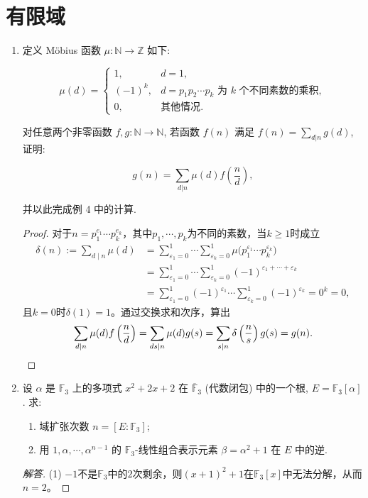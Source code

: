 \section{有限域}

\begin{enumerate}
\item 定义 Möbius 函数 $\mu : \mathbb{N} \to \mathbb{Z}$ 如下:

\[
\mu(d) =
\begin{cases}
1, & d = 1, \\
(-1)^k, & d = p_1p_2 \cdots p_k\text{ 为 }k\text{ 个不同素数的乘积}, \\
0, & \text{其他情况}.
\end{cases}
\]

对任意两个非零函数 $f, g : \mathbb{N} \to \mathbb{N}$, 若函数 $f(n)$ 满足 $f(n) = \sum\limits_{d|n} g(d)$, 证明:

\[
g(n) = \sum_{d|n} \mu(d) f\left(\frac{n}{d}\right),
\]

并以此完成例 4 中的计算.
\begin{proof}
    对于$n=p_1^{e_1} \cdots p_k^{e_k}$，其中$p_1,\cdots,p_k$为不同的素数，当$k\geqslant1$时成立
    \begin{align*}
        \delta(n):=\sum_{d \mid n}\mu(d)&=\sum_{\varepsilon_1=0}^{1}\cdots\sum_{\varepsilon_k=0}^{1}\mu\big(p_1^{\varepsilon_1} \cdots p_k^{\varepsilon_k}\big)\\
        &=\sum_{\varepsilon_1=0}^{1}\cdots\sum_{\varepsilon_k=0}^{1}(-1)^{\varepsilon_1+\cdots+\varepsilon_k}\\
        &=\sum_{\varepsilon_1=0}^{1}(-1)^{\varepsilon_1}\cdots\sum_{\varepsilon_k=0}^{1}(-1)^{\varepsilon_k}=0^k=0,
    \end{align*}
    且$k=0$时$\delta(1)=1$。通过交换求和次序，算出
    \[\sum_{d \mid n}\mu(d)f\left(\frac{n}{d}\right)=\sum_{ds \mid n}\mu(d)g(s)
    =\sum_{s \mid n}\delta\left(\frac{n}{s}\right)g(s)=g(n).\qedhere\]
\end{proof}
\item 设 $\alpha$ 是 $\mathbb{F}_3$ 上的多项式 $x^2 + 2x + 2$ 
在 $\overline{\mathbb{F}}_3$ (代数闭包) 中的一个根, $E = \mathbb{F}_3[\alpha]$. 求:
\begin{enumerate}[label=(\arabic*)]
    \item 域扩张次数 $n = [E : \mathbb{F}_3]$;
    \item 用 $1, \alpha, \cdots, \alpha^{n-1}$ 的 $\mathbb{F}_3$-线性组合表示元素 $\beta = \alpha^2 + 1$ 在 $E$ 中的逆.
\end{enumerate}
\begin{proof}[解答]
    (1) $-1$不是$\mathbb{F}_3$中的$2$次剩余，则$(x+1)^2+1$在$\mathbb{F}_3[x]$中无法分解，从而$n=2$。


\end{proof}
\end{enumerate}
